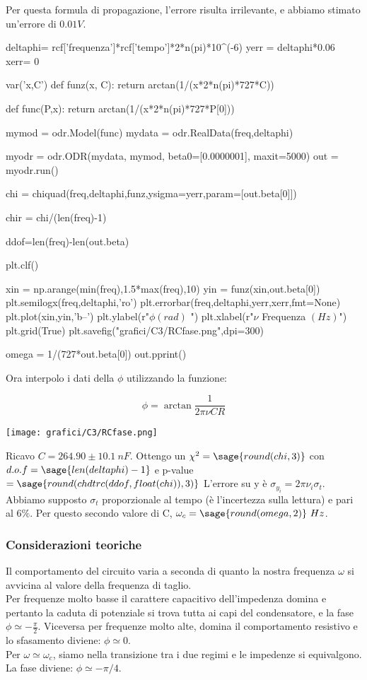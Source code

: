 Per questa formula di propagazione, l'errore risulta irrilevante, e abbiamo stimato un'errore di $0.01 V$.
\begin{sagesilent}

deltaphi= rcf['frequenza']*rcf['tempo']*2*n(pi)*10^(-6)
yerr = deltaphi*0.06
xerr= 0

var('x,C')
def funz(x, C):
    return arctan(1/(x*2*n(pi)*727*C))
    
def func(P,x):
    return arctan(1/(x*2*n(pi)*727*P[0]))
    
mymod = odr.Model(func)
mydata = odr.RealData(freq,deltaphi)

myodr = odr.ODR(mydata, mymod, beta0=[0.0000001], maxit=5000)
out = myodr.run()

chi = chiquad(freq,deltaphi,funz,ysigma=yerr,param=[out.beta[0]])

chir = chi/(len(freq)-1)

ddof=len(freq)-len(out.beta) 
 
plt.clf()

xin = np.arange(min(freq),1.5*max(freq),10)
yin = funz(xin,out.beta[0])
plt.semilogx(freq,deltaphi,'ro')
plt.errorbar(freq,deltaphi,yerr,xerr,fmt=None)
plt.plot(xin,yin,'b--')
plt.ylabel(r"$\phi (rad)$ ")
plt.xlabel(r"$\nu$ Frequenza $(Hz)$")
plt.grid(True)
plt.savefig("grafici/C3/RCfase.png",dpi=300)

omega = 1/(727*out.beta[0])
out.pprint()

\end{sagesilent}


Ora interpolo i dati della $ \phi$ utilizzando la funzione:

$$ \phi = \arctan \frac{1}{2\pi\nu C R} $$


\begin{center}
 \texttt{[image: grafici/C3/RCfase.png]}
\end{center}


Ricavo $C=264.90 \pm 10.1\ nF$.
Ottengo un $\chi^2 = \sage{round(chi,3)}$ con $d.o.f= \sage{len(deltaphi)-1}$ e p-value $=\sage{round(chdtrc(ddof,float(chi)),3)}$
L'errore su y è $\sigma_{y_i} = 2 \pi \nu_i \sigma_{t}$. Abbiamo supposto $\sigma_{t}$ proporzionale al tempo (è l'incertezza sulla lettura) e pari al $6\%$.
Per questo secondo valore di C, $\omega_c = \sage{round(omega,2)}\ Hz$. 

\subsubsection{Considerazioni teoriche}
Il comportamento del circuito varia a seconda di quanto la nostra frequenza $\omega$ si avvicina al valore della frequenza di taglio. \\
Per frequenze molto basse il carattere capacitivo dell'impedenza domina e pertanto la caduta di potenziale si trova tutta ai capi del condensatore, e la fase $\phi \simeq -\frac{\pi}{2}$. Viceversa per frequenze molto alte, domina il comportamento resistivo e lo sfasamento diviene: $ \phi \simeq 0$. \\  
Per $\omega \simeq \omega_c$, siamo nella transizione tra i due regimi e le impedenze si equivalgono. La fase diviene: $ \phi \simeq -\pi/4$.  \\

